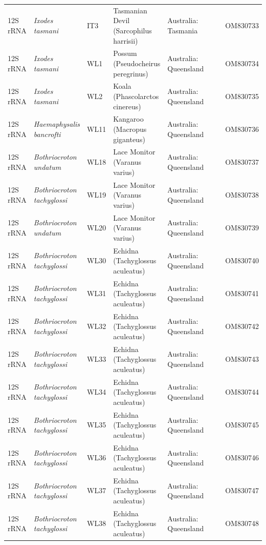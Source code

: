 \documentclass[a4paper, nobind]{templates/ociamthesis}
\begin{document}
\begin{landscape}
\begin{longtable}[t]{l>{}lllllll}
12S rRNA & \em{Ixodes tasmani} & IT3 & Tasmanian Devil (Sarcophilus harrisii) & Australia: Tasmania &  &  & OM830733\\
12S rRNA & \em{Ixodes tasmani} & WL1 & Possum (Pseudocheirus peregrinus) & Australia: Queensland &  &  & OM830734\\
12S rRNA & \em{Ixodes tasmani} & WL2 & Koala (Phascolarctos  cinereus) & Australia: Queensland &  &  & OM830735\\
12S rRNA & \em{Haemaphysalis bancrofti} & WL11 & Kangaroo (Macropus giganteus) & Australia: Queensland &  &  & OM830736\\
12S rRNA & \em{Bothriocroton undatum} & WL18 & Lace Monitor (Varanus varius) & Australia: Queensland &  &  & OM830737\\
12S rRNA & \em{Bothriocroton tachyglossi} & WL19 & Lace Monitor (Varanus varius) & Australia: Queensland &  &  & OM830738\\
12S rRNA & \em{Bothriocroton undatum} & WL20 & Lace Monitor (Varanus varius) & Australia: Queensland &  &  & OM830739\\
12S rRNA & \em{Bothriocroton tachyglossi} & WL30 & Echidna (Tachyglossus aculeatus) & Australia: Queensland &  &  & OM830740\\
12S rRNA & \em{Bothriocroton tachyglossi} & WL31 & Echidna (Tachyglossus aculeatus) & Australia: Queensland &  &  & OM830741\\
12S rRNA & \em{Bothriocroton tachyglossi} & WL32 & Echidna (Tachyglossus aculeatus) & Australia: Queensland &  &  & OM830742\\
12S rRNA & \em{Bothriocroton tachyglossi} & WL33 & Echidna (Tachyglossus aculeatus) & Australia: Queensland &  &  & OM830743\\
12S rRNA & \em{Bothriocroton tachyglossi} & WL34 & Echidna (Tachyglossus aculeatus) & Australia: Queensland &  &  & OM830744\\
12S rRNA & \em{Bothriocroton tachyglossi} & WL35 & Echidna (Tachyglossus aculeatus) & Australia: Queensland &  &  & OM830745\\
12S rRNA & \em{Bothriocroton tachyglossi} & WL36 & Echidna (Tachyglossus aculeatus) & Australia: Queensland &  &  & OM830746\\
12S rRNA & \em{Bothriocroton tachyglossi} & WL37 & Echidna (Tachyglossus aculeatus) & Australia: Queensland &  &  & OM830747\\
12S rRNA & \em{Bothriocroton tachyglossi} & WL38 & Echidna (Tachyglossus aculeatus) & Australia: Queensland &  &  & OM830748\\

\end{longtable}
\end{landscape}
\end{document}
